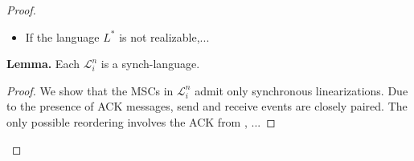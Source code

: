 \begin{proof}
\begin{itemize}
  
  \item[$\Leftarrow$] If the language $L^*$ is not realizable,...

\end{itemize}

\textbf{Lemma.} Each $\mathcal{L}_i^n$ is a synch-language.

\begin{proof}
We show that the MSCs in $\mathcal{L}_i^n$ admit only synchronous linearizations.
Due to the presence of ACK messages, send and receive
events are closely paired. The only possible reordering involves
the ACK from , ...
\end{proof}


\end{proof}


